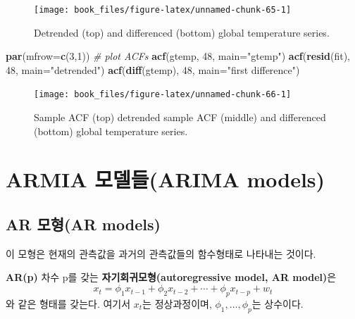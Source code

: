 \documentclass[b5paper,]{book}
\makeatletter
\newenvironment{Shaded}{\begin{snugshade}}{\end{snugshade}}
\newcommand{\KeywordTok}[1]{\textcolor[rgb]{0.13,0.29,0.53}{\textbf{{#1}}}}
\newcommand{\DataTypeTok}[1]{\textcolor[rgb]{0.13,0.29,0.53}{{#1}}}
\newcommand{\DecValTok}[1]{\textcolor[rgb]{0.00,0.00,0.81}{{#1}}}
\newcommand{\StringTok}[1]{\textcolor[rgb]{0.31,0.60,0.02}{{#1}}}
\newcommand{\CommentTok}[1]{\textcolor[rgb]{0.56,0.35,0.01}{\textit{{#1}}}}
\newcommand{\NormalTok}[1]{{#1}}
\newenvironment{kframe}{%
\medskip{}
\setlength{\fboxsep}{.8em}
 \def\at@end@of@kframe{}%
 \ifinner\ifhmode%
  \def\at@end@of@kframe{\end{minipage}}%
  \begin{minipage}{\columnwidth}%
 \fi\fi%
 \def\FrameCommand##1{\hskip\@totalleftmargin \hskip-\fboxsep
 \colorbox{shadecolor}{##1}\hskip-\fboxsep
     \hskip-\linewidth \hskip-\@totalleftmargin \hskip\columnwidth}%
 \MakeFramed {\advance\hsize-\width
   \@totalleftmargin\z@ \linewidth\hsize
   \@setminipage}}%
 {\par\unskip\endMakeFramed%
 \at@end@of@kframe}
\renewenvironment{Shaded}{\begin{kframe}}{\end{kframe}}
\theoremstyle{definition}
\theoremstyle{definition}
\theoremstyle{definition}
\theoremstyle{remark}
\let\BeginKnitrBlock\begin \let\EndKnitrBlock\end
\makeatother
\begin{document}
\begin{figure}

{\centering \texttt{[image: book\_files/figure-latex/unnamed-chunk-65-1]} 

}

\caption{Detrended (top) and differenced (bottom) global temperature series.}\label{fig:unnamed-chunk-65}
\end{figure}

\begin{Shaded}
\begin{Highlighting}[]
\KeywordTok{par}\NormalTok{(}\DataTypeTok{mfrow=}\KeywordTok{c}\NormalTok{(}\DecValTok{3}\NormalTok{,}\DecValTok{1}\NormalTok{)) }\CommentTok{# plot ACFs}
\KeywordTok{acf}\NormalTok{(gtemp, }\DecValTok{48}\NormalTok{, }\DataTypeTok{main=}\StringTok{"gtemp"}\NormalTok{)}
\KeywordTok{acf}\NormalTok{(}\KeywordTok{resid}\NormalTok{(fit), }\DecValTok{48}\NormalTok{, }\DataTypeTok{main=}\StringTok{"detrended"}\NormalTok{)}
\KeywordTok{acf}\NormalTok{(}\KeywordTok{diff}\NormalTok{(gtemp), }\DecValTok{48}\NormalTok{, }\DataTypeTok{main=}\StringTok{"first difference"}\NormalTok{)}
\end{Highlighting}
\end{Shaded}

\begin{figure}

{\centering \texttt{[image: book\_files/figure-latex/unnamed-chunk-66-1]} 

}

\caption{Sample ACF (top) detrended sample ACF (middle) and differenced (bottom) global temperature series.}\label{fig:unnamed-chunk-66}
\end{figure}

\section{ARMIA 모델들(ARIMA models)}\label{armia-arima-models}

\subsection{AR 모형(AR models)}\label{ar-ar-models}

이 모형은 현재의 관측값을 과거의 관측값들의 함수형태로 나타내는 것이다.

\BeginKnitrBlock{definition}[자기회귀모형]
\protect\hypertarget{def:unnamed-chunk-67}{}{\label{def:unnamed-chunk-67}
{} }\textbf{AR(p)} 차수 p를 갖는
\textbf{자기회귀모형(autoregressive model, AR model)}은
\[x_{t}=\phi_{1}x_{t-1}+\phi_{2}x_{t-2} + \cdots + \phi_{p}x_{t-p}+w_{t}\]
와 같은 형태를 갖는다. 여기서 \(x_{t}\)는 정상과정이며,
\(\phi_{1},\ldots , \phi_{p}\)는 상수이다.
\EndKnitrBlock{definition}
\end{document}
